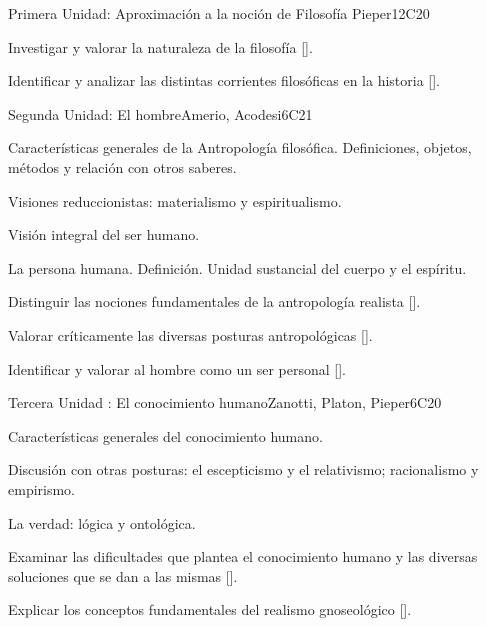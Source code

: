 \begin{syllabus}
\begin{unit}{}{Primera Unidad: Aproximación a la noción de Filosofía }{Pieper}{12}{C20}
\begin{learningoutcomes}
	\item Investigar y valorar la naturaleza de la filosofía [\Usage].
	\item Identificar y analizar las distintas corrientes filosóficas en la historia [\Usage].
\end{learningoutcomes}
\end{unit}

\begin{unit}{}{Segunda Unidad: El hombre}{Amerio, Acodesi}{6}{C21}
\begin{topics}
	\item Características generales de la Antropología filosófica. Definiciones, objetos, métodos y relación con otros saberes.
	\item Visiones reduccionistas: materialismo y espiritualismo.
	\item Visión integral del ser humano.
    \item La persona humana. Definición. Unidad sustancial del cuerpo y el espíritu.
\end{topics}

\begin{learningoutcomes}
	\item Distinguir las nociones fundamentales de la antropología realista [\Usage].
	\item Valorar críticamente las diversas posturas antropológicas [\Usage].
	\item Identificar y valorar al hombre como un ser personal [\Usage].
\end{learningoutcomes}
\end{unit}

\begin{unit}{}{Tercera Unidad : El conocimiento humano}{Zanotti, Platon, Pieper}{6}{C20}
\begin{topics}
	\item Características generales del conocimiento humano.
    \item Discusión con otras posturas: el escepticismo y el relativismo; racionalismo y empirismo.
    \item La verdad: lógica y ontológica.
\end{topics}
\begin{learningoutcomes}
	\item Examinar las dificultades que plantea el conocimiento humano y las diversas soluciones que se dan a las mismas [\Usage].
    \item Explicar los conceptos fundamentales del realismo gnoseológico [\Usage].
\end{learningoutcomes}
\end{unit}


\end{syllabus}

